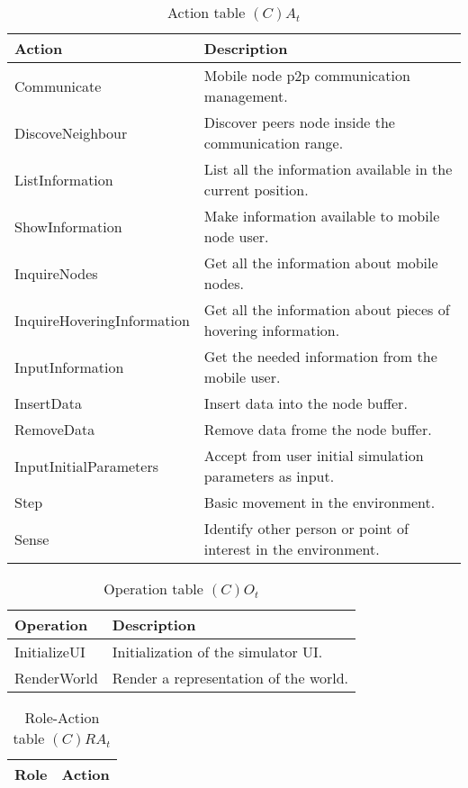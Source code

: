 \begin{table}[H]
	\centering
	\begin{tabular}{|p{4cm}|p{8cm}|}
			\hline
			\textbf{Action} & \textbf{Description} \\
			\hline
			Communicate & Mobile node p2p communication management.\\
			\hline
			DiscoveNeighbour & Discover peers node inside the communication range. \\
			\hline
			ListInformation & List all the information available in the current position.\\
			\hline
			ShowInformation & Make information available to mobile node user.\\
			\hline
			InquireNodes & Get all the information about mobile nodes.\\
			\hline
			InquireHoveringInformation & Get all the information about pieces of
			hovering information.\\
			\hline
			InputInformation & Get the needed information from the mobile user. \\
			\hline
			InsertData & Insert data into the node buffer. \\
			\hline
			RemoveData & Remove data frome the node buffer. \\
			\hline
			InputInitialParameters & Accept from user initial simulation parameters
			as input. \\
			\hline
			Step & Basic movement in the environment. \\
			\hline
			Sense & Identify other person or point of interest in the environment. \\
			\hline
		\end{tabular}
	\caption{Action table $(C)A_t$}
	\label{tab:cat}
\end{table}

\begin{table}[H]
	\centering
	\begin{tabular}{|p{4cm}|p{8cm}|}
			\hline
			\textbf{Operation} & \textbf{Description} \\
			\hline
			InitializeUI & Initialization of the simulator UI. \\
			\hline
			RenderWorld & Render a representation of the world. \\
			\hline
		\end{tabular}
	\caption{Operation table $(C)O_t$}
	\label{tab:cot}
\end{table}

\begin{table}[H]
	\centering
	\begin{tabular}{|p{4cm}|p{8cm}|}
			\hline
			\textbf{Role} & \textbf{Action} \\
			\hline
		\end{tabular}
	\caption{Role-Action table $(C)RA_t$}
	\label{tab:rat}
\end{table}

